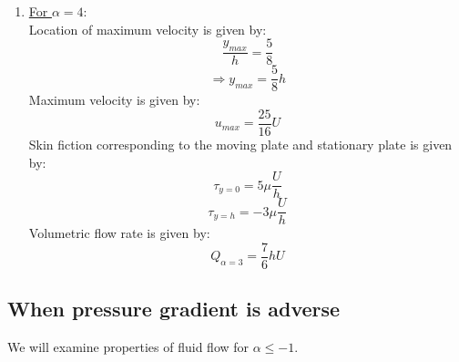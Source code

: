\documentclass[14pt,one side, a4paper]{extbook}
\begin{document}
\begin{enumerate}
	 		\item {\underline{For $\alpha=4$}:}
	 		\\Location of maximum velocity is given by:
	 		$$\frac{y_{max}}{h}=\frac{5}{8}$$
	 		$$\Longrightarrow y_{max}=\frac{5}{8}h$$
	 		Maximum velocity is given by:
	 		$$u_{max}=\frac{25}{16}U$$
	 		Skin fiction corresponding to the moving plate and stationary plate is given by:
	 		$$\tau_{y=0}=5\mu\frac{U}{h}$$
	 		$$\tau_{y=h}=-3\mu\frac{U}{h}$$
	 		Volumetric flow rate is given by:
	 		$$Q_{\alpha=3}=\frac{7}{6}hU$$
	 	\end{enumerate}
	 	\subsection{When pressure gradient is adverse}
	 	We will examine properties of fluid flow for $\alpha\leq-1$. 
\end{document}

